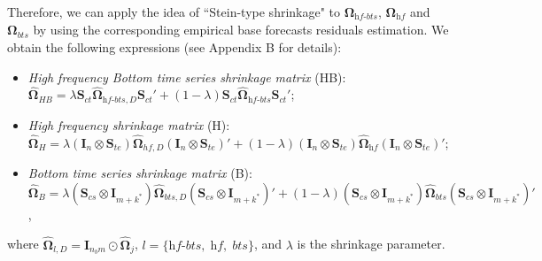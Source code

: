 \documentclass[a4paper,11pt]{article}
\newcommand{\Ivet}{\bm{I}}
\newcommand{\Svet}{\bm{S}}
\newcommand{\Omegavet}{\bm{\Omega}}
\theoremstyle{definition}
\begin{document}
Therefore, we can apply the idea of “Stein-type shrinkage" \citep{efron1977} to $\Omegavet_{\textit{hf-bts}}$, $\Omegavet_{\textit{hf}}$ and $\Omegavet_{\textit{bts}}$ by using the corresponding empirical base forecasts residuals estimation. We obtain the following expressions (see Appendix B for details):
\begin{itemize}[nosep]
	\item \textit{High frequency Bottom time series shrinkage matrix} (HB): \\ 
	$\widehat{\Omegavet}_{HB} = \lambda \Svet_{ct}\widehat{\Omegavet}_{\textit{hf-bts}, D}\Svet_{ct}'+ (1-\lambda) \Svet_{ct}\widehat{\Omegavet}_{\textit{hf-bts}}\Svet_{ct}'$;
	\item \textit{High frequency shrinkage matrix} (H): \\ $\widehat{\Omegavet}_{H}  = \lambda (\Ivet_{n} \otimes \Svet_{te})\widehat{\Omegavet}_{hf, D}(\Ivet_{n} \otimes \Svet_{te})' + (1-\lambda) (\Ivet_{n} \otimes \Svet_{te})\widehat{\Omegavet}_{\textit{hf}}(\Ivet_{n} \otimes \Svet_{te})'$;
	\item \textit{Bottom time series shrinkage matrix} (B): \\$\widehat{\Omegavet}_{B} = \lambda \left(\Svet_{cs} \otimes \Ivet_{m+k^\ast}\right)\widehat{\Omegavet}_{bts, D}\left(\Svet_{cs} \otimes \Ivet_{m+k^\ast}\right)' +  (1-\lambda) \left(\Svet_{cs} \otimes \Ivet_{m+k^\ast}\right)\widehat{\Omegavet}_{bts}\left(\Svet_{cs} \otimes \Ivet_{m+k^\ast}\right)'$,
\end{itemize}
where $\widehat{\Omegavet}_{l, D} = \Ivet_{n_b m}\odot\widehat{\Omegavet}_{j}$, $l = \{\textit{hf-bts}, \;\textit{hf}, \;\textit{bts}\}$, and $\lambda$ is the shrinkage parameter.
\end{document}
